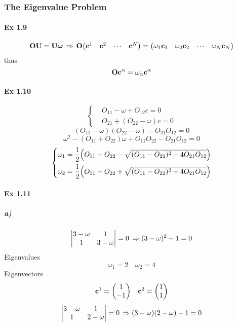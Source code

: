 \documentclass[a4paper]{article}
\DeclareMathOperator{\dra}{\Rightarrow}
\newcommand{\ex}[1]{\paragraph{Ex #1}}
\newcommand{\subex}[1]{\subparagraph{#1}}
\numberwithin{equation}{subsection}
\begin{document}
\subsubsection{The Eigenvalue Problem}
\ex{1.9}
\begin{equation}\label{key}
\vb{O}\vb{U} = \vb{U}\bm\omega \;\dra\; \vb{O}\mqty(\vb{c}^1 & \vb{c}^2 & \cdots & \vb{c}^N) = \mqty(\omega_1\vb{c}_1 & \omega_2\vb{c}_2 & \cdots & \omega_N\vb{c}_N)
\end{equation}
thus
\begin{equation}\label{key}
\vb{O}\vb{c}^\alpha = \omega_\alpha \vb{c}^\alpha
\end{equation}
\ex{1.10}
\begin{equation}\label{key}
\left\{
\begin{aligned}
&O_{11}-\omega + O_{12}c = 0\\
&O_{21} + (O_{22}-\omega)c = 0
\end{aligned}\right.
\end{equation}
\begin{equation}\label{key}
(O_{11}-\omega)(O_{22}-\omega) - O_{21}O_{12} = 0
\end{equation}
\begin{equation}\label{key}
\omega^2 - (O_{11}+O_{22})\omega + O_{11}O_{22} - O_{21}O_{12} = 0
\end{equation}
\begin{equation}\label{key}
\left\{\begin{aligned}
&\omega_1 = \dfrac{1}{2}\qty(O_{11}+O_{22} - \sqrt{(O_{11}-O_{22})^2 + 4O_{21}O_{12}})\\
&\omega_2 = \dfrac{1}{2}\qty(O_{11}+O_{22} + \sqrt{(O_{11}-O_{22})^2 + 4O_{21}O_{12}})
\end{aligned}\right.
\end{equation}
\ex{1.11}
\subex{a)}
\begin{equation}\label{key}
\mqty| 3-\omega & 1\\1 & 3-\omega| = 0 \;\dra\; (3-\omega)^2 - 1 = 0
\end{equation}
Eigenvalues
\begin{equation}\label{key}
\omega_1 = 2 \quad \omega_2 = 4
\end{equation}
Eigenvectors
\begin{equation}\label{key}
\vb{c}^1 = \mqty(1\\-1) \quad \vb{c}^2 = \mqty(1\\1)
\end{equation}
\begin{equation}\label{key}
\mqty|3-\omega & 1\\1 & 2-\omega| = 0 \;\dra\; (3-\omega)(2-\omega) - 1 = 0
\end{equation}
\end{document}
